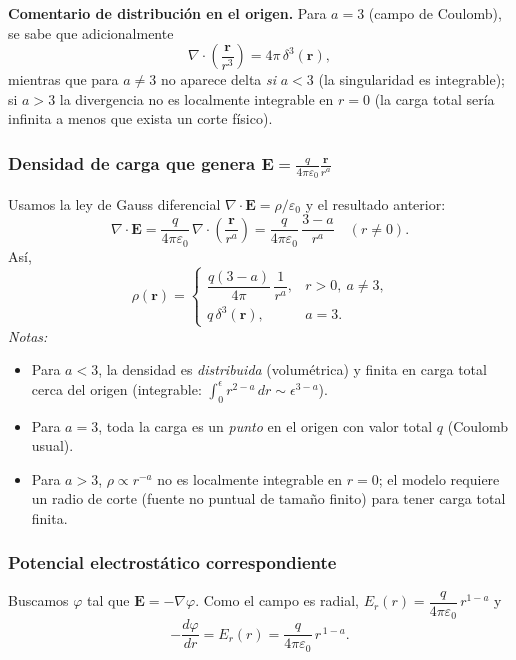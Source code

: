 \documentclass{article}
\begin{document}
\textbf{Comentario de distribución en el origen.}  
Para $a=3$ (campo de Coulomb), se sabe que adicionalmente
\[
\nabla\!\cdot\!\left(\frac{\mathbf r}{r^{3}}\right)=4\pi\,\delta^{3}(\mathbf r),
\]
mientras que para $a\neq 3$ no aparece delta \emph{si} $a<3$ (la singularidad es integrable); si $a>3$ la divergencia no es localmente integrable en $r=0$ (la carga total sería infinita a menos que exista un corte físico).

\subsubsection*{Densidad de carga que genera $\displaystyle \mathbf E=\frac{q}{4\pi\varepsilon_0}\frac{\mathbf r}{r^{a}}$}
Usamos la ley de Gauss diferencial $\nabla\!\cdot\mathbf E=\rho/\varepsilon_0$ y el resultado anterior:
\[
\nabla\!\cdot\mathbf E
=\frac{q}{4\pi\varepsilon_0}\,\nabla\!\cdot\!\left(\frac{\mathbf r}{r^{a}}\right)
=\frac{q}{4\pi\varepsilon_0}\,\frac{3-a}{r^{a}}
\quad (r\neq 0).
\]
Así,
\[
\boxed{\
\rho(\mathbf r)=
\begin{cases}
\dfrac{q(3-a)}{4\pi}\,\dfrac{1}{r^{a}}, & r>0,\ a\neq 3,\\[10pt]
q\,\delta^{3}(\mathbf r), & a=3.
\end{cases}}
\]
\textit{Notas:}
\begin{itemize}
\item Para $a<3$, la densidad es \emph{distribuida} (volumétrica) y finita en carga total cerca del origen (integrable: $\int_0^\epsilon r^{2-a}\,dr\sim \epsilon^{3-a}$).
\item Para $a=3$, toda la carga es un \emph{punto} en el origen con valor total $q$ (Coulomb usual).
\item Para $a>3$, $\rho\propto r^{-a}$ no es localmente integrable en $r=0$; el modelo requiere un radio de corte (fuente no puntual de tamaño finito) para tener carga total finita.
\end{itemize}

\subsubsection*{Potencial electrostático correspondiente}
Buscamos $\varphi$ tal que $\mathbf E=-\nabla\varphi$.  
Como el campo es radial, $E_r(r)=\dfrac{q}{4\pi\varepsilon_0}\,r^{1-a}$ y
\[
-\frac{d\varphi}{dr}=E_r(r)=\frac{q}{4\pi\varepsilon_0}\,r^{\,1-a}.
\]
\end{document}

